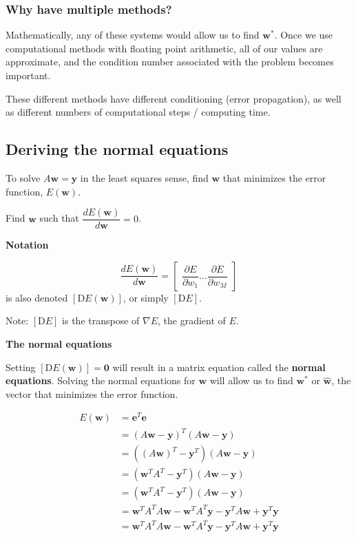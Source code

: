 \documentclass[12pt,letterpaper,noanswers]{exam}
\newcommand{\vc}[1]{\boldsymbol{#1}}
\begin{document}
\subsubsection{Why have multiple methods?}

Mathematically, any of these systems would allow us to find $\vc{w}^*$.  Once we use computational methods with floating point arithmetic, all of our values are approximate, and the condition number associated with the problem becomes important.

These different methods have different conditioning (error propagation), as well as different numbers of computational steps / computing time.


\subsection{Deriving the normal equations}


 To solve $A\vc{w} = \vc{y}$ in the least squares sense, find $\vc{w}$ that minimizes the error function, $E(\vc{w})$.
    
  Find $\vc{w}$ such that $\dfrac{dE(\vc{w})}{d\vc{w}} = 0$.
  
    \noindent\textbf{Notation}
  \begin{tcolorbox}
      \[\dfrac{dE(\vc{w})}{d\vc{w}}=\left[\begin{array}{ccc} \dfrac{\partial E}{\partial w_1} \hdots \dfrac{\partial E}{\partial w_M} \end{array}\right]\] is also denoted $\left[\text{D}E(\vc{w})\right]$, or simply $\left[\text{D}E\right]$.
      
      Note: $\left[\text{D}E\right]$ is the transpose of $\nabla E$, the gradient of $E$.
  \end{tcolorbox}
  

\noindent\textbf{The normal equations}
\begin{tcolorbox}
Setting $\left[\text{D}E(\vc{w})\right] = \vc{0}$ will result in a matrix equation called the \textbf{normal equations}.  Solving the normal equations for $\vc{w}$ will allow us to find $\vc{w}^*$ or $\hat{\vc{w}}$, the vector that minimizes the error function.
\end{tcolorbox}

\begin{align*}
        E(\vc{w}) &= \vc{e}^T\vc{e} \\
        &=(A\vc{w}-\vc{y})^T(A\vc{w}-\vc{y}) \\
        &=\left((A\vc{w})^T-\vc{y}^T\right)(A\vc{w}-\vc{y}) \\
        &=\left(\vc{w}^TA^T-\vc{y}^T\right)(A\vc{w}-\vc{y}) \\
        &=\left(\vc{w}^TA^T-\vc{y}^T\right)(A\vc{w}-\vc{y}) \\
        &=\vc{w}^TA^TA\vc{w}-\vc{w}^TA^T\vc{y}-\vc{y}^TA\vc{w} + \vc{y}^T\vc{y} \\
        &=\vc{w}^TA^TA\vc{w}-\vc{w}^TA^T\vc{y}-\vc{y}^TA\vc{w} + \vc{y}^T\vc{y}
    \end{align*}
    
\end{document}
